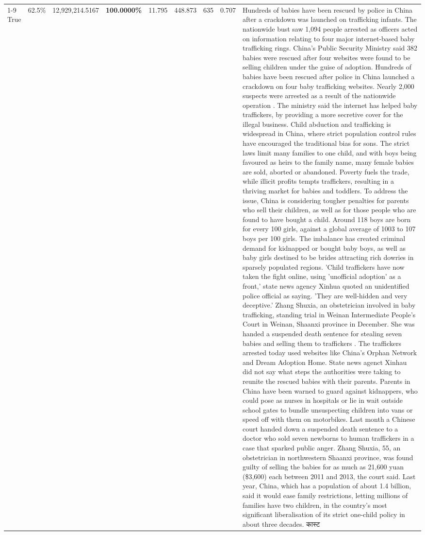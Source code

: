 \begin{table}[H]
\begin{tabular}{lllrlllll}
\cline{1-9}
True & 62.5\% & 12,929,214.5167 & \bfseries \color{red} 100.0000\% & 11.795 & 448.873 & 635 & 0.707 & Hundreds of babies have been rescued by police in China after a crackdown was launched on trafficking infants. The nationwide bust saw 1,094 people arrested as officers acted on information relating to four major internet-based baby trafficking rings. China's Public Security Ministry said 382 babies were rescued after four websites were found to be selling children under the guise of adoption. Hundreds of babies have been rescued after police in China launched a crackdown on four baby trafficking websites. Nearly 2,000 suspects were arrested as a result of the nationwide operation . The ministry said the internet has helped baby traffickers, by providing a more secretive cover for the illegal business. Child abduction and trafficking is widespread in China, where strict population control rules have encouraged the traditional bias for sons. The strict laws limit many families to one child, and with boys being favoured as heirs to the family name, many female babies are sold, aborted or abandoned. Poverty fuels the trade, while illicit profits tempts traffickers, resulting in a thriving market for babies and toddlers. To address the issue, China is considering tougher penalties for parents who sell their children, as well as for those people who are found to have bought a child. Around 118 boys are born for every 100 girls, against a global average of 1003 to 107 boys per 100 girls. The imbalance has created criminal demand for kidnapped or bought baby boys, as well as baby girls destined to be brides attracting rich dowries in sparsely populated regions. 'Child traffickers have now taken the fight online, using 'unofficial adoption' as a front,' state news agency Xinhua quoted an unidentified police official as saying. 'They are well-hidden and very deceptive.' Zhang Shuxia, an obstetrician involved in baby trafficking, standing trial in Weinan Intermediate People's Court in Weinan, Shaanxi province in December. She was handed a suspended death sentence for stealing seven babies and selling them to traffickers . The traffickers arrested today used websites like China's Orphan Network and Dream Adoption Home. State news agenct Xinhau did not say what steps the authorities were taking to reunite the rescued babies with their parents. Parents in China have been warned to guard against kidnappers, who could pose as nurses in hospitals or lie in wait outside school gates to bundle unsuspecting children into vans or speed off with them on motorbikes. Last month a Chinese court handed down a suspended death sentence to a doctor who sold seven newborns to human traffickers in a case that sparked public anger. Zhang Shuxia, 55, an obstetrician in northwestern Shaanxi province, was found guilty of selling the babies for as much as 21,600 yuan (\$3,600) each between 2011 and 2013, the court said. Last year, China, which has a population of about 1.4 billion, said it would ease family restrictions, letting millions of families have two children, in the country's most significant liberalisation of its strict one-child policy in about three decades. कास्ट \\

\end{tabular}
\end{table}
